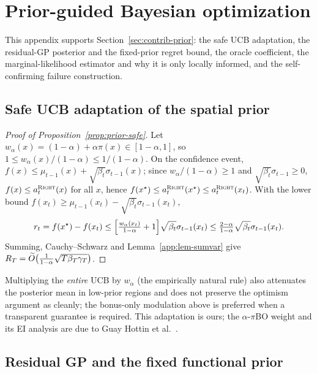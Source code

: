 \section{Prior-guided Bayesian optimization}
\label{app:prior}

This appendix supports Section~\ref{sec:contrib-prior}: the safe UCB adaptation,
the residual-GP posterior and the fixed-prior regret bound, the oracle
coefficient, the marginal-likelihood estimator and why it is only locally
informed, and the self-confirming failure construction.

\subsection{Safe UCB adaptation of the spatial prior}

\begin{proof}[Proof of Proposition~\ref{prop:prior-safe}]
Let $w_\alpha(x)=(1-\alpha)+\alpha\pi(x)\in[1-\alpha,1]$, so
$1\le w_\alpha(x)/(1-\alpha)\le1/(1-\alpha)$. On the confidence event,
$f(x)\le\mu_{t-1}(x)+\sqrt{\beta_t}\sigma_{t-1}(x)$; since
$w_\alpha/(1-\alpha)\ge1$ and $\sqrt{\beta_t}\sigma_{t-1}\ge0$,
$f(x)\le a_t^{\textsc{Right}}(x)$ for all $x$, hence
$f(x^\star)\le a_t^{\textsc{Right}}(x^\star)\le a_t^{\textsc{Right}}(x_t)$. With the lower bound
$f(x_t)\ge\mu_{t-1}(x_t)-\sqrt{\beta_t}\sigma_{t-1}(x_t)$,
\[
r_t=f(x^\star)-f(x_t)\le\Bigl[\tfrac{w_\alpha(x_t)}{1-\alpha}+1\Bigr]
\sqrt{\beta_t}\sigma_{t-1}(x_t)\le\tfrac{2-\alpha}{1-\alpha}\sqrt{\beta_t}\sigma_{t-1}(x_t).
\]
Summing, Cauchy--Schwarz and Lemma~\ref{app:lem-sumvar} give
$R_T=\widetilde O\bigl(\tfrac{1}{1-\alpha}\sqrt{T\beta_T\gamma_T}\bigr)$.
\end{proof}

\begin{remark}
Multiplying the \emph{entire} UCB by $w_\alpha$ (the empirically natural rule)
also attenuates the posterior mean in low-prior regions and does not preserve the
optimism argument as cleanly; the bonus-only modulation above is preferred when a
transparent guarantee is required. This adaptation is ours; the $\alpha$-$\pi$BO
weight and its EI analysis are due to Guay Hottin et al.~\cite{guayhottin2025}.
\end{remark}

\subsection{Residual GP and the fixed functional prior}

